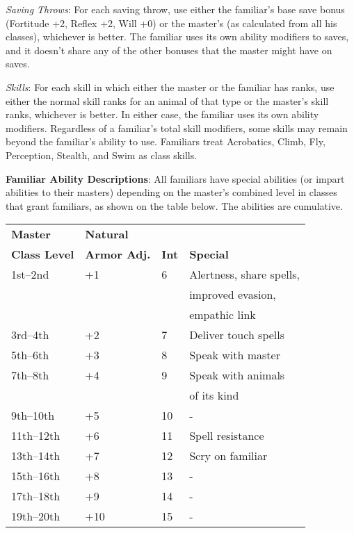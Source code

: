 \textit{Saving Throws}: For each saving throw, use either the familiar's base save bonus (Fortitude +2, Reflex +2, Will +0) or the master's (as calculated from all his classes), whichever is better. The familiar uses its own ability modifiers to saves, and it doesn't share any of the other bonuses that the master might have on saves.
				
\textit{Skills}: For each skill in which either the master or the familiar has ranks, use either the normal skill ranks for an animal of that type or the master's skill ranks, whichever is better. In either case, the familiar uses its own ability modifiers. Regardless of a familiar's total skill modifiers, some skills may remain beyond the familiar's ability to use. Familiars treat Acrobatics, Climb, Fly, Perception, Stealth, and Swim as class skills.
				
\textbf{Familiar Ability Descriptions}: All familiars have special abilities (or impart abilities to their masters) depending on the master's combined level in classes that grant familiars, as shown on the table below. The abilities are cumulative. 

\begin{table}
 \sffamily
 \begin{tabular}{llll}
\textbf{Master}      & \textbf{Natural}\\
\textbf{Class Level} & \textbf{Armor Adj.} & \textbf{Int} & \textbf{Special} \\
1st--2nd & +1 & 6 & Alertness, share spells, \\
         &    &   & improved evasion, \\
         &    &   & empathic link \\
3rd--4th & +2 & 7 & Deliver touch spells\\
5th--6th & +3 & 8 & Speak with master\\
7th--8th & +4 & 9 & Speak with animals \\
         &    &   & of its kind\\
9th--10th & +5 & 10 & - \\
11th--12th & +6 & 11 & Spell resistance \\
13th--14th & +7 & 12 & Scry on familiar\\
15th--16th & +8 & 13 & - \\
17th--18th & +9 & 14 & -\\
19th--20th & +10 & 15 & -\\  
 \end{tabular}

\end{table}
			
